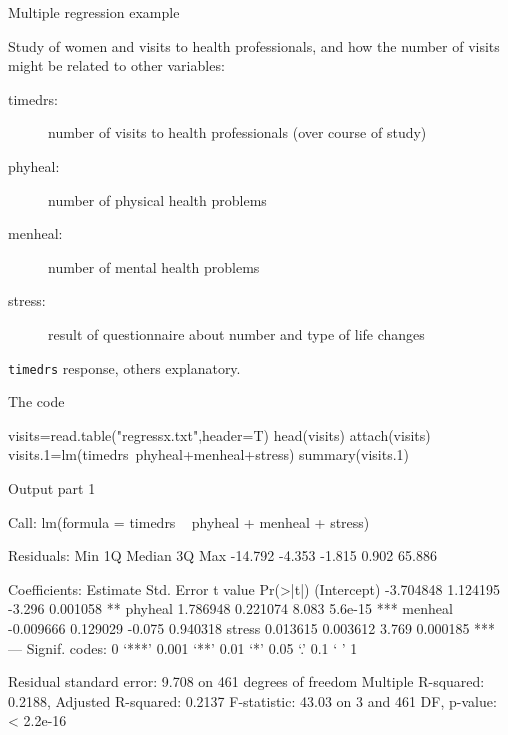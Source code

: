 \begin{frame}[fragile]{Multiple regression example}

Study of women and visits to health professionals, and how the number of visits might be related to other variables:

\begin{description}
\item[timedrs:] number of visits to health professionals (over course of study)
\item[phyheal:] number of physical health problems
\item[menheal:] number of mental health problems
\item[stress:] result of questionnaire about number and type of life changes
\end{description}

\verb-timedrs- response, others explanatory.

\end{frame}

\begin{frame}[fragile]{The code}


{\small
\begin{semiverbatim}
visits=read.table("regressx.txt",header=T)
head(visits)
attach(visits)
visits.1=lm(timedrs~phyheal+menheal+stress)
summary(visits.1)
\end{semiverbatim}
}

\end{frame}

\begin{frame}[fragile]{Output part 1}

{\scriptsize
\begin{semiverbatim}
Call:
lm(formula = timedrs ~ phyheal + menheal + stress)

Residuals:
    Min      1Q  Median      3Q     Max 
-14.792  -4.353  -1.815   0.902  65.886 

Coefficients:
             Estimate Std. Error t value Pr(>|t|)    
(Intercept) -3.704848   1.124195  -3.296 0.001058 ** 
phyheal      1.786948   0.221074   8.083  5.6e-15 ***
menheal     -0.009666   0.129029  -0.075 0.940318    
stress       0.013615   0.003612   3.769 0.000185 ***
---
Signif. codes:  0 ‘***’ 0.001 ‘**’ 0.01 ‘*’ 0.05 ‘.’ 0.1 ‘ ’ 1 

Residual standard error: 9.708 on 461 degrees of freedom
Multiple R-squared: 0.2188,	Adjusted R-squared: 0.2137 
F-statistic: 43.03 on 3 and 461 DF,  p-value: < 2.2e-16 

\end{semiverbatim}
}

\end{frame}


